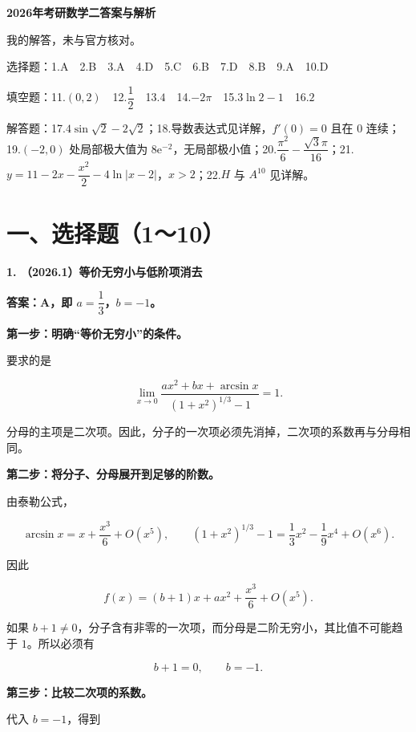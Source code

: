\documentclass[UTF8,11pt,fontset=windows]{ctexart}
\begin{document}
{\LARGE\bfseries 2026年考研数学二答案与解析\par}\vspace{6pt}

\begingroup\color{gray}我的解答，未与官方核对。\par\endgroup

\begingroup\color{gray}选择题：1.A　2.B　3.A　4.D　5.C　6.B　7.D　8.B　9.A　10.D

填空题：11.$(0,2)$　12.$\dfrac12$　13.$4$　14.$-2\pi$　15.$3\ln2-1$　16.$2$

解答题：17.$4\sin\sqrt2-2\sqrt2$；18.导数表达式见详解，$f'(0)=0$ 且在 $0$ 连续；19.$(-2,0)$ 处局部极大值为 $8\mathrm{e}^{-2}$，无局部极小值；20.$\dfrac{\pi^2}{6}-\dfrac{\sqrt3\pi}{16}$；21.$y=11-2x-\dfrac{x^2}{2}-4\ln|x-2|$，$x>2$；22.$H$ 与 $A^{10}$ 见详解。\par\endgroup

\clearpage

\section*{一、选择题（1～10）}

\textbf{1. （2026.1）等价无穷小与低阶项消去}

\textbf{答案：A，即 $a=\dfrac13$，$b=-1$。}

\textbf{第一步：明确“等价无穷小”的条件。}

要求的是

$$
\lim_{x\to0}\frac{ax^2+bx+\arcsin x}{(1+x^2)^{1/3}-1}=1.
$$

分母的主项是二次项。因此，分子的一次项必须先消掉，二次项的系数再与分母相同。

\textbf{第二步：将分子、分母展开到足够的阶数。}

由泰勒公式，

$$
\arcsin x=x+\frac{x^3}{6}+O(x^5),
\qquad
(1+x^2)^{1/3}-1=\frac13x^2-\frac19x^4+O(x^6).
$$

因此

$$
f(x)=(b+1)x+ax^2+\frac{x^3}{6}+O(x^5).
$$

如果 $b+1\ne0$，分子含有非零的一次项，而分母是二阶无穷小，其比值不可能趋于 $1$。所以必须有

$$
b+1=0,\qquad b=-1.
$$

\textbf{第三步：比较二次项的系数。}

代入 $b=-1$，得到
\end{document}
